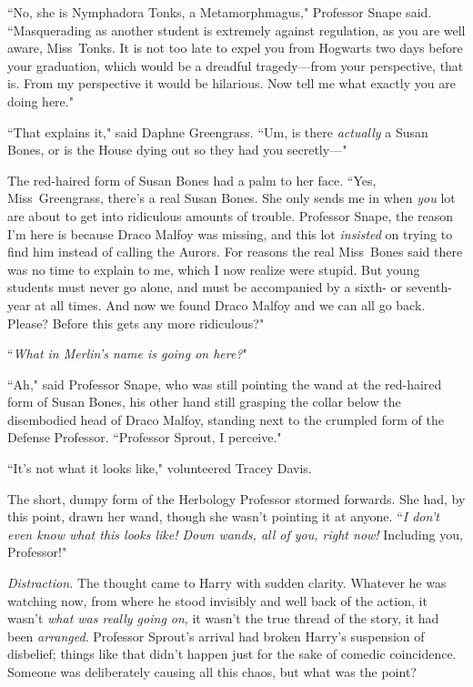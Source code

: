 ``No, she is Nymphadora Tonks, a Metamorphmagus," Professor Snape said. ``Masquerading as another student is extremely against regulation, as you are well aware, Miss~Tonks. It is not too late to expel you from Hogwarts two days before your graduation, which would be a dreadful tragedy—from your perspective, that is. From my perspective it would be hilarious. Now tell me what exactly you are doing here."

``That explains it," said Daphne Greengrass. ``Um, is there \emph{actually} a Susan Bones, or is the House dying out so they had you secretly—"

The red-haired form of Susan Bones had a palm to her face. ``Yes, Miss~Greengrass, there's a real Susan Bones. She only sends me in when \emph{you} lot are about to get into ridiculous amounts of trouble. Professor Snape, the reason I'm here is because Draco Malfoy was missing, and this lot \emph{insisted} on trying to find him instead of calling the Aurors. For reasons the real Miss~Bones said there was no time to explain to me, which I now realize were stupid. But young students must never go alone, and must be accompanied by a sixth- or seventh-year at all times. And now we found Draco Malfoy and we can all go back. Please? Before this gets any more ridiculous?"

``\emph{What in Merlin's name is going on here?}"

``Ah," said Professor Snape, who was still pointing the wand at the red-haired form of Susan Bones, his other hand still grasping the collar below the disembodied head of Draco Malfoy, standing next to the crumpled form of the Defense Professor. ``Professor Sprout, I perceive."

``It's not what it looks like," volunteered Tracey Davis.

The short, dumpy form of the Herbology Professor stormed forwards. She had, by this point, drawn her wand, though she wasn't pointing it at anyone. ``\emph{I don't even know what this looks like! \emph{Down wands, all of you,} right now!} Including you, Professor!"

\emph{Distraction.} The thought came to Harry with sudden clarity. Whatever he was watching now, from where he stood invisibly and well back of the action, it wasn't \emph{what was really going on}, it wasn't the true thread of the story, it had been \emph{arranged}. Professor Sprout's arrival had broken Harry's suspension of disbelief; things like that didn't happen just for the sake of comedic coincidence. Someone was deliberately causing all this chaos, but what was the point?

